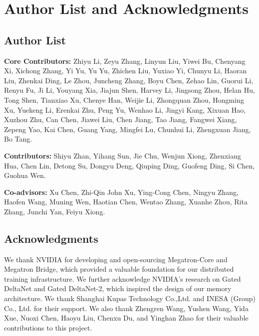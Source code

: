 \section{Author List and Acknowledgments}

\subsection{Author List}

\begingroup
\renewcommand{\thefootnote}{\ensuremath{\dagger}}

\textbf{Core Contributors:}
Zhiyu Li, Zeyu Zhang, Linyun Liu, Yiwei Bu, Chenyang Xi, Xichong Zhang, Yi Yu, Yu Yu, Zhichen Liu, Yuxiao Yi, Chunyu Li, Haoran Liu, Zhenkai Ding, Le Zhou, Juncheng Zhang, Boyu Chen, Zehao Lin, Guorui Li, Renyu Fu, Ji Li, Youyang Xia, Jiajun Shen, Harvey Li, Jingsong Zhou, Helan Hu, Tong Shen, Tianxiao Xu, Chenye Han, Weijie Li, Zhongquan Zhou, Hongming Xu, Yuekeng Li, Erenkai Zhu, Peng Yu, Wenhao Li, Jingyi Kang, Xixuan Hao, Xuzhou Zhu, Can Chen, Jiawei Liu, Chen Jiang, Tao Jiang, Fangwei Xiang, Zepeng Yao, Kai Chen, Guang Yang, Mingfei Lu, Chunhui Li, Zhengxuan Jiang, Bo Tang.

\textbf{Contributors:}
 Shiyu Zhan, Yihang Sun, Jie Chu, Wenjun Xiong, Zhenxiang Hua, Chen Lin, Detong Su, Dongyu Deng, Qiuping Ding, Guofeng Ding, Si Chen, Guohua Wen.


\textbf{Co-advisors:}
Xu Chen, Zhi-Qin John Xu, Ying-Cong Chen, Ningyu Zhang, Haofen Wang, Muning Wen, Haotian Chen, Wentao Zhang, Xuanhe Zhou, Rita Zhang, Junchi Yan, Feiyu Xiong.

\endgroup

\subsection{Acknowledgments}
We thank NVIDIA for developing and open-sourcing Megatron-Core and Megatron Bridge, which provided a valuable foundation for our distributed training infrastructure.
We further acknowledge NVIDIA's research on Gated DeltaNet and Gated DeltaNet-2, which inspired the design of our memory architecture.
We thank Shanghai Kupas Technology Co.,Ltd. and INESA (Group) Co., Ltd. for their support.
We also thank Zhengren Wang, Yushen Wang, Yida Xue, Nuoxi Chen, Haoyu Liu, Chenxu Du, and Yinghan Zhao for their valuable contributions to this project.

